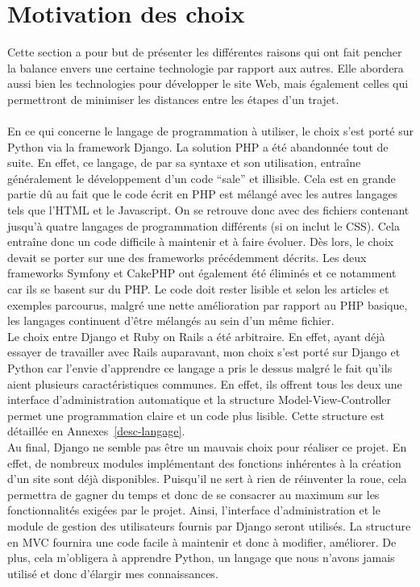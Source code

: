 \documentclass[12pt, a4paper, oneside]{article}
\begin{document}
\section{Motivation des choix}\label{choix}
    Cette section a pour but de présenter les différentes raisons qui ont fait pencher la balance envers une certaine technologie par rapport aux autres. Elle abordera aussi bien les technologies pour développer le site Web, mais également celles qui permettront de minimiser les distances entre les étapes d'un trajet.\\\\
    \indent En ce qui concerne le langage de programmation à utiliser, le choix s'est porté sur Python via la framework Django. La solution PHP a été abandonnée tout de suite. En effet, ce langage, de par sa syntaxe et son utilisation, entraîne généralement le développement d'un code ``sale'' et illisible. Cela est en grande partie dû au fait que le code écrit en PHP est mélangé avec les autres langages tels que l'HTML et le Javascript. On se retrouve donc avec des fichiers contenant jusqu'à quatre langages de programmation différents (si on inclut le CSS). Cela entraîne donc un code difficile à maintenir et à faire évoluer. Dès lors, le choix devait se porter sur une des frameworks précédemment décrits. Les deux frameworks Symfony et CakePHP ont également été éliminés et ce notamment car ils se basent sur du PHP. Le code doit rester lisible et selon les articles et exemples parcourus, malgré une nette amélioration par rapport au PHP basique, les langages continuent d'être mélangés au sein d'un même fichier.\\
    \indent Le choix entre Django et Ruby on Rails a été arbitraire. En effet, ayant déjà essayer de travailler avec Rails auparavant, mon choix s'est porté sur Django et Python car l'envie d'apprendre ce langage a pris le dessus malgré le fait qu'ils aient plusieurs caractéristiques communes. En effet, ils offrent tous les deux une interface d'administration automatique et la structure Model-View-Controller permet une programmation claire et un code plus lisible. Cette structure est détaillée en Annexes~\ref{desc-langage}.\\
    \indent Au final, Django ne semble pas être un mauvais choix pour réaliser ce projet. En effet, de nombreux modules implémentant des fonctions inhérentes à la création d'un site sont déjà disponibles. Puisqu'il ne sert à rien de réinventer la roue, cela permettra de gagner du temps et donc de se consacrer au maximum sur les fonctionnalités exigées par le projet. Ainsi, l'interface d'administration et le module de gestion des utilisateurs fournis par Django seront utilisés. La structure en MVC fournira une code facile à maintenir et donc à modifier, améliorer. De plus, cela m'obligera à apprendre Python, un langage que nous n'avons jamais utilisé et donc d'élargir mes connaissances.\\\\
\end{document}
